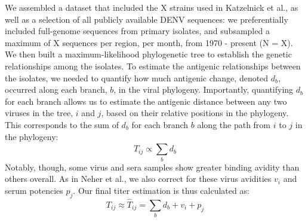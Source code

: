 \documentclass[11pt,oneside,letterpaper]{article}
\begin{document}
We assembled a dataset that included the X strains used in Katzelnick et al., as well as a selection of all publicly available DENV sequences: we preferentially included full-genome sequences from primary isolates, and subsampled a maximum of X sequences per region, per month, from 1970 - present (N = X).
We then built a maximum-likelihood phylogenetic tree to establish the genetic relationships among the isolates.
To estimate the antigenic relationships between the isolates, we needed to quantify how much antigenic change, denoted $d_b$, occurred along each branch, $b$, in the viral phylogeny.
Importantly, quantifying $d_b$ for each branch allows us to estimate the antigenic distance between any two viruses in the tree, $i$ and $j$, based on their relative positions in the phylogeny.
This corresponds to the sum of $d_b$ for each branch $b$ along the path from $i$ to $j$ in the phylogeny:
$$\hat{T}_{ij} \propto \sum_{b} d_b$$
Notably, though, some virus and sera samples show greater binding avidity than others overall.
As in Neher et al., we also correct for these virus avidities $v_i$ and serum potencies $p_j$.
Our final titer estimation is thus calculated as: $$T_{ij} \approx \hat{T}_{ij} = \sum_{b} d_b + v_i + p_j$$
\end{document}

